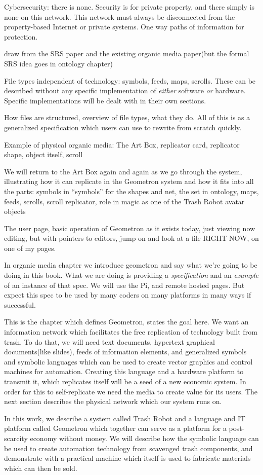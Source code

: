 Cybersecurity: there is none. Security is for private property, and
there simply is none on this network. This network must always be
disconnected from the property-based Internet or private systems. One
way paths of information for protection.

draw from the SRS paper and the existing organic media paper(but the
formal SRS idea goes in ontology chapter)

File types independent of technology: symbols, feeds, maps, scrolls.
These can be described without any specific implementation of
\emph{either} software \emph{or} hardware. Specific implementations will
be dealt with in their own sections.

How files are structured, overview of file types, what they do. All of
this is as a generalized specification which users can use to rewrite
from scratch quickly.

Example of physical organic media: The Art Box, replicator card,
replicator shape, object itself, scroll

We will return to the Art Box again and again as we go through the
system, illustrating how it can replicate in the Geometron system and
how it fits into all the parts: symbols in ``symbols'' for the shapes
and net, the set in ontology, maps, feeds, scrolls, scroll replicator,
role in magic as one of the Trash Robot avatar objects

The user page, basic operation of Geometron as it exists today, just
viewing now editing, but with pointers to editors, jump on and look at a
file RIGHT NOW, on one of my pages.

In organic media chapter we introduce geometron and say what we're going
to be doing in this book. What we are doing is providing a
\emph{specification} and an \emph{example} of an instance of that spec.
We will use the Pi, and remote hosted pages. But expect this spec to be
used by many coders on many platforms in many ways if successful.

This is the chapter which defines Geometron, states the goal here.  We want an information network which facilitates the free replication of technology built from trash.  To do that, we will need text documents, hypertext graphical documents(like slides), feeds of information elements, and generalized symbols and symbolic languages which can be used to create vector graphics and control machines for automation.  Creating this language and a hardware platform to transmit it, which replicates itself will be a seed of a new economic system.  In order for this to self-replicate we need the media to create value for its users.  The next section describes the physical network which our system runs on.   

In this work, we describe a system called Trash Robot and a language and IT platform called Geometron which together can serve as a platform for a post-scarcity economy without money.  We will describe how the symbolic language can be used to create automation technology from scavenged trash components, and demonstrate with a practical machine which itself is used to fabricate materials which can then be sold.  

